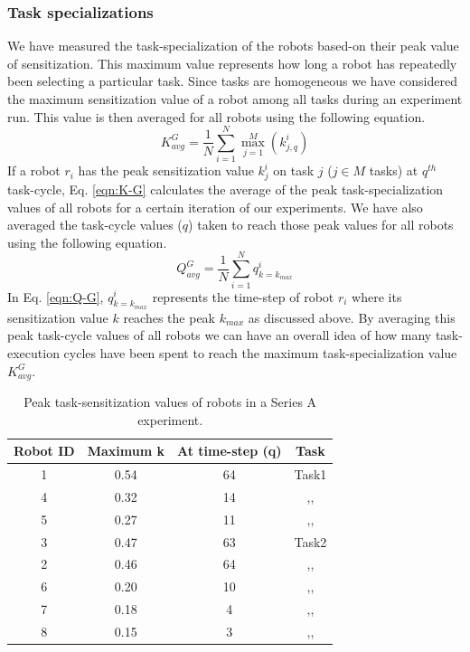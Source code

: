 \documentclass[smallcondensed]{svjour3}
\begin{document}
\subsubsection{Task specializations}
We have measured the task-specialization of the robots based-on their peak value of sensitization. This maximum value represents how long a robot has repeatedly been selecting a particular task. Since tasks are homogeneous we have considered the maximum sensitization value of a robot among all tasks during an experiment run. This value is then averaged for all robots using the following  equation. 
\begin{equation}
K^G_{avg} = \frac{1}{N}\sum_{i=1}^{N} \max_{j=1}^M\left ( k^i_{j, q} \right ) 
\label{eqn:K-G}
\end{equation}
If a robot $r_i$ has the peak sensitization value $k^i_j$ on task $j$ ($j \in M$ tasks)  at $q^{th}$ task-cycle, Eq. \ref{eqn:K-G} calculates the average of the peak task-specialization values of all robots for a certain iteration of our experiments. We have also averaged the task-cycle values ($q$) taken to reach those peak values for all robots using the following equation.
\begin{equation}
Q^G_{avg}= \frac{1}{N}\sum_{i=1}^{N} q^i_{k=k_{max}}
\label{eqn:Q-G}
\end{equation}
In Eq. \ref{eqn:Q-G}, $q^i_{k=k_{max}}$ represents the time-step of robot $r_i$  where its sensitization value $k$ reaches the peak $k_{max}$ as discussed above. By averaging this peak task-cycle values of all robots we can have an overall idea of how many task-execution cycles have been spent to reach the maximum task-specialization value $K^G_{avg}$.
\begin{table}
\centering
\caption{Peak task-sensitization values of robots in a Series A experiment.}
\begin{tabular}{|c|c|c|c|}
\hline \textbf{Robot ID} & \textbf{Maximum k} & \textbf{At time-step (q)} & \textbf{Task} \\ 
\hline 1 & 0.54 & 64 & Task1\\
\hline 4 & 0.32 & 14 & ,,\\
\hline 5 & 0.27 & 11 & ,,\\
\hline 3 & 0.47 & 63 & Task2\\
\hline 2 & 0.46 & 64 & ,,\\
\hline 6 & 0.20 & 10 & ,,\\
\hline 7 & 0.18 & 4 & ,,\\
\hline 8 & 0.15 & 3 & ,,\\
\hline 
\end{tabular} 
\label{table:K-G-SA}
\end{table}
\end{document}
